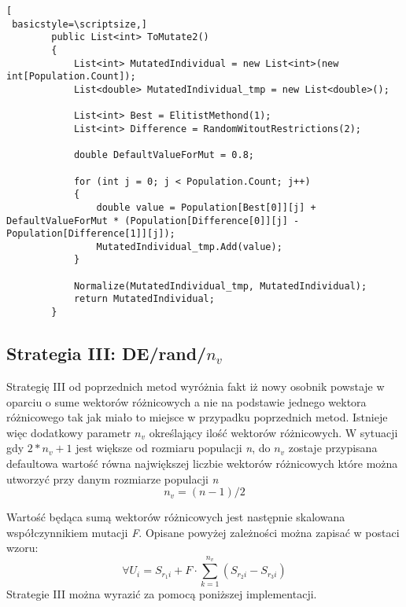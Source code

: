 \begin{program}[h!]
\begin{lstlisting}[
 basicstyle=\scriptsize,]
        public List<int> ToMutate2()
        {
            List<int> MutatedIndividual = new List<int>(new int[Population.Count]);
            List<double> MutatedIndividual_tmp = new List<double>();

            List<int> Best = ElitistMethond(1);
            List<int> Difference = RandomWitoutRestrictions(2);

            double DefaultValueForMut = 0.8;

            for (int j = 0; j < Population.Count; j++)
            {
                double value = Population[Best[0]][j] + DefaultValueForMut * (Population[Difference[0]][j] - Population[Difference[1]][j]);
                MutatedIndividual_tmp.Add(value);
            }

            Normalize(MutatedIndividual_tmp, MutatedIndividual);
            return MutatedIndividual;
        }
\end{lstlisting}
\end{program}


\subsection{Strategia III: DE/rand/$n_{v}$}\label{sec:narzedzia}

Strategię III od poprzednich metod wyróżnia fakt iż nowy osobnik powstaje w oparciu o sume wektorów różnicowych a nie na podstawie jednego wektora różnicowego tak jak miało to miejsce w przypadku poprzednich metod. Istnieje więc dodatkowy parametr $n_{v}$ określający ilość wektorów różnicowych. W sytuacji gdy $  2 * n_{v} + 1$ jest większe od rozmiaru populacji \textsl{n}, do $n_{v}$ zostaje przypisana defaultowa wartość równa największej liczbie wektorów różnicowych które można utworzyć przy danym rozmiarze populacji \textsl{n}\\
$$
 n_{v} = (n - 1) / 2
$$

Wartość będąca sumą wektorów różnicowych jest następnie skalowana współczynnikiem mutacji \textsl{F}. Opisane powyżej zależności można zapisać w postaci wzoru:\\
$$
 \forall U_{i} =S_{r_{1}i} +  F \cdot \sum_{k=1}^{n_{v}}(S_{r_{2}i} - S_{r_{3}i})
$$
Strategie III można wyrazić za pomocą poniższej implementacji.

